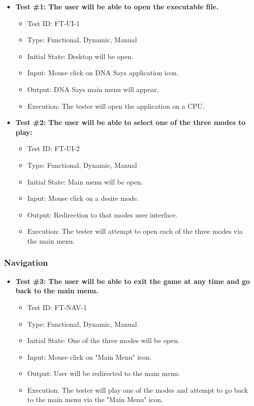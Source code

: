 \documentclass[12pt, titlepage]{article}
\begin{document}
\begin{itemize}

\item \textbf{Test \#1: The user will be able to open the executable file.}
\begin{itemize}
\item Test ID: FT-UI-1
\item Type: Functional, Dynamic, Manual		
\item Initial State: Desktop will be open. 					
\item Input: Mouse click on DNA Says application icon. 					
\item Output: DNA Says main menu will appear. 					
\item Execution: The tester will open the application on a CPU.
\end{itemize}
					
\item \textbf{Test \#2: The user will be able to select one of the three modes to play:} 
\begin{itemize}
\item Test ID: FT-UI-2
\item Type: Functional, Dynamic, Manual 		
\item Initial State: Main menu will be open. 					
\item Input: Mouse click on a desire mode. 					
\item Output: Redirection to that modes user interface.					
\item Execution: The tester will attempt to open each of the three modes via the main menu.
\end{itemize}


\end{itemize}

\subsubsection{Navigation}

\begin{itemize}

\item \textbf{Test \#3: The user will be able to exit the game at any time and go back to the main menu.}
\begin{itemize}
\item Test ID: FT-NAV-1
\item Type: Functional, Dynamic, Manual 		
\item Initial State: One of the three modes will be open.					
\item Input: Mouse click on "Main Menu" icon.					
\item Output: User will be redirected to the main menu.					
\item Execution: The tester will play one of the modes and attempt to go back to the main menu via the "Main Menu" icon.
\end{itemize}

\end{itemize}
\end{document}
